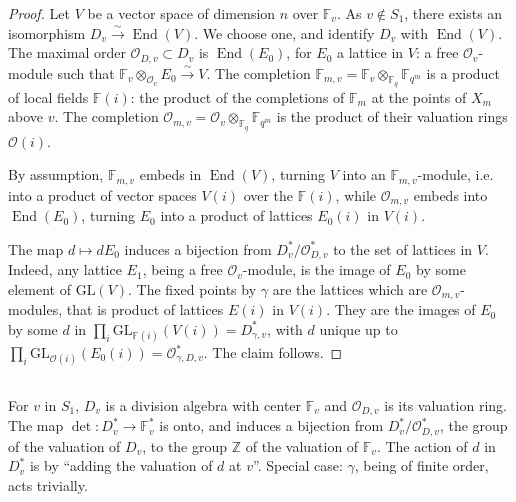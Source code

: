 \documentclass[11pt,a4paper]{article}
\theoremstyle{plain}
\theoremstyle{definition}
\DeclareMathOperator{\End}{End}
\newcommand{\Fq}{\mathbb{F}_q}
\newcommand{\F}{\mathbb{F}}
\newcommand{\Z}{\mathbb{Z}}
\newcommand{\GL}{\mathrm{GL}}
\begin{document}
\begin{proof}
Let $V$ be a vector space of dimension $n$ over $\mathbb{F}_v$. As $v \notin S_1$, there exists an isomorphism $D_v \xrightarrow{\sim} \End(V)$. We choose one, and identify $D_v$ with $\End(V)$. The maximal order $\mathcal{O}_{D,v} \subset D_v$ is $\End(E_0)$, for $E_0$ a lattice in $V$: a free $\mathcal{O}_v$-module such that $\mathbb{F}_v \otimes_{\mathcal{O}_v} E_0 \xrightarrow{\sim} V$. The completion $\mathbb{F}_{m,v} = \mathbb{F}_v \otimes_{\Fq} \F_{q^m}$ is a product of local fields $\mathbb{F}(i)$: the product of the completions of $\mathbb{F}_m$ at the points of $X_m$ above $v$. The completion $\mathcal{O}_{m,v} = \mathcal{O}_v \otimes_{\Fq} \F_{q^m}$ is the product of their valuation rings $\mathcal{O}(i)$.

By assumption, $\mathbb{F}_{m,v}$ embeds in $\End(V)$, turning $V$ into an $\mathbb{F}_{m,v}$-module, i.e. into a product of vector spaces $V(i)$ over the $\mathbb{F}(i)$, while $\mathcal{O}_{m,v}$ embeds into $\End(E_0)$, turning $E_0$ into a product of lattices $E_0(i)$ in $V(i)$.

The map $d \mapsto dE_0$ induces a bijection from $D_v^*/\mathcal{O}_{D,v}^*$ to the set of lattices in $V$. Indeed, any lattice $E_1$, being a free $\mathcal{O}_v$-module, is the image of $E_0$ by some element of $\GL(V)$. The fixed points by $\gamma$ are the lattices which are $\mathcal{O}_{m,v}$-modules, that is product of lattices $E(i)$ in $V(i)$. They are the images of $E_0$ by some $d$ in $\prod_i \GL_{\mathbb{F}(i)}(V(i)) = D_{\gamma,v}^*$, with $d$ unique up to $\prod_i \GL_{\mathcal{O}(i)}(E_0(i)) = \mathcal{O}_{\gamma,D,v}^*$. The claim follows.
\end{proof}

\subsection{}

For $v$ in $S_1$, $D_v$ is a division algebra with center $\mathbb{F}_v$ and $\mathcal{O}_{D,v}$ is its valuation ring. The map $\det: D_v^* \to \mathbb{F}_v^*$ is onto, and induces a bijection from $D_v^*/\mathcal{O}_{D,v}^*$, the group of the valuation of $D_v$, to the group $\Z$ of the valuation of $\mathbb{F}_v$. The action of $d$ in $D_v^*$ is by ``adding the valuation of $d$ at $v$''. Special case: $\gamma$, being of finite order, acts trivially.
\end{document}
